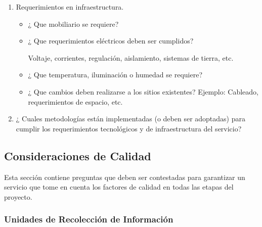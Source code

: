 \begin{enumerate}
\item  Requerimientos en infraestructura. 

\begin{itemize}
\item ¿ Que mobiliario se requiere? 
\item ¿ Que requerimientos eléctricos deben ser cumplidos?

Voltaje, corrientes, regulación, aislamiento, sistemas de tierra, etc.

\item ¿ Que temperatura, iluminación o humedad se requiere? 
\item ¿ Que cambios deben realizarse a los sitios existentes?
Ejemplo: Cableado, requerimientos de espacio, etc.
\end{itemize}

\item  ¿ Cuales metodologías están implementadas (o deben ser adoptadas) para cumplir los requerimientos tecnológicos y de infraestructura del servicio?                                                                                          \end{enumerate}


\subsection{Consideraciones de Calidad}

Esta sección contiene preguntas que deben ser contestadas para garantizar un servicio que tome en cuenta los factores de calidad en todas las etapas del proyecto.

\subsubsection{Unidades de Recolección de Información}

